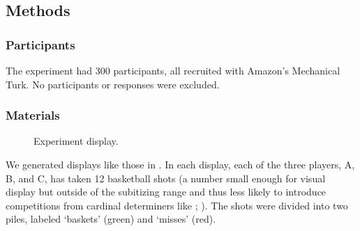 \documentclass[leqno,12pt]{article}
\begin{document}

\subsection{Methods}

\subsubsection{Participants}

The experiment had 300 participants, all recruited with Amazon's
Mechanical Turk. No participants or responses were excluded.

\subsubsection{Materials}

\begin{figure}[t]
  \centering
  \caption{Experiment display.}
  \label{fig:exp1}
\end{figure}


We generated displays like those in . In each
display, each of the three players, A, B, and C, has taken 12 basketball shots (a number
small enough for visual display but outside of the subitizing range
and thus less likely to introduce competitions from cardinal
determiners like ;
\citealt{Degen:Tanenhaus:2014}). The shots were divided into two
piles, labeled `baskets' (green) and `misses' (red). 
\end{document}
